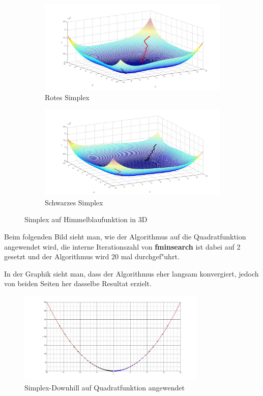 \begin{figure}[htb]
\centering
\begin{subfigure}[b]{0.49\textwidth}
\centering
\includegraphics[width=\textwidth]{../bilder/Himmelblau3DRot.jpg}
\caption{Rotes Simplex}
\end{subfigure} \begin{subfigure}[b]{0.49\textwidth}
\centering
\includegraphics[width=\textwidth]{../bilder/Himmelblau3DSchwarz.jpg}
\caption{Schwarzes Simplex}
\end{subfigure}
\caption{Simplex auf Himmelblaufunktion in 3D}
\label{fig:Himmelblau}
\end{figure}



Beim folgenden Bild sieht man, wie der Algorithmus auf die Quadratfunktion angewendet wird, die interne Iterationszahl von \textbf{fminsearch} ist dabei auf 2 gesetzt und der Algorithmus wird 20 mal durchgef"uhrt.

In der Graphik sieht man, dass der Algorithmus eher langsam konvergiert, jedoch von beiden Seiten her dasselbe Resultat erzielt. 
\begin{figure}[h]
	\centering
	\includegraphics[width=0.8\textwidth]{../bilder/Quadrat.jpg}%
  	\caption{Simplex-Downhill auf Quadratfunktion angewendet}%
	\label{fig:SQ1}%
\end{figure}